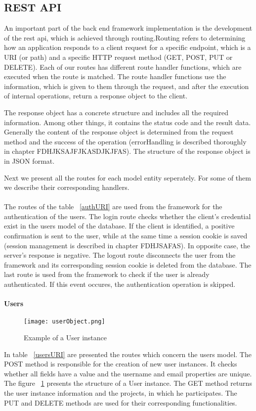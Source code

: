 \subsection{REST API}
An important part of the back end framework implementation is the development of the rest api, which is achieved through routing.Routing refers to determining how an application responds to a client request for a specific endpoint, which is a URI (or path) and a specific HTTP request method (GET, POST, PUT or DELETE). Each of our routes has different route handler functions, which are executed when the route is matched. The route handler functions use the information, which is given to them through the request, and after the execution of internal operations, return a response object to the client.\par
	 The response object has a concrete structure and includes all the required information. Among other things, it contains the status code and the result data. Generally the content of the response object is determined from the request method and the success of the operation (errorHandling is described thoroughly in chapter FDHJKSAJFJKASDJKJFAS). The structure of the response object is in JSON format. \par 
	 	Next we present all the routes for each model entity seperately. For some of them we describe their corresponding handlers.
	 	
\paragraph{}
The routes of the table ~\ref{authURI} are used from the framework for the authentication of the users. The login route checks whether the client's credential exist in the users model of the database. If the client is identified, a positive confirmation is sent to the user, while at the same time a session cookie is saved (session management is described in chapter FDHJSAFAS). In opposite case, the server's response is negative. The logout route disconnects the user from the framework and its corresponding session cookie is deleted from the database. The last route is used from the framework to check if the user is already authenticated. If this event occures, the authentication operation is skipped.

\paragraph{Users}
\begin{figure}
	\texttt{[image: userObject.png]}
	\caption{Example of a User instance}
	\label{userObject}
\end{figure}
In table ~\ref{usersURI} are presented the routes which concern the users model. The POST method is responsible for the creation of new user instances. It checks whether all fields have a value and the username and email properties are unique. The figure ~\ref{userObject} presents the structure of a User instance. The GET method returns the user instance information and the projects, in which he participates. The PUT and DELETE methods are used for their corresponding functionalities.

